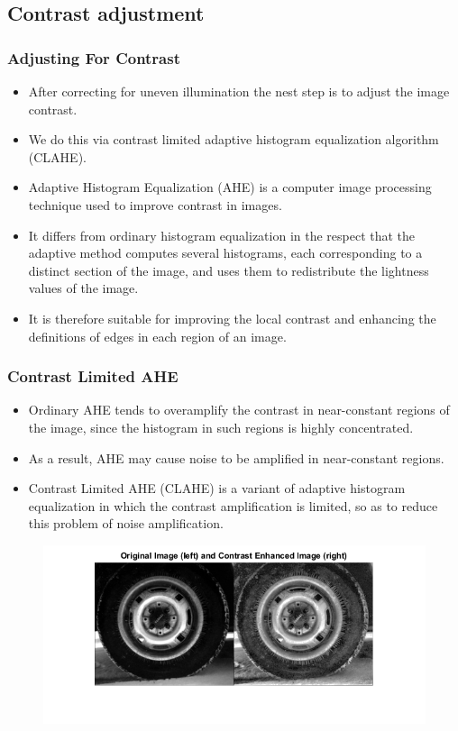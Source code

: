 \documentclass{beamer}
\begin{document}
\subsection{Contrast adjustment}
\begin{frame}
\frametitle{Adjusting For Contrast}
\begin{itemize}
   \item After correcting for uneven illumination the nest step is to adjust the image contrast.
   \item  We do this via contrast limited adaptive histogram equalization algorithm (CLAHE). 
   \item Adaptive  Histogram Equalization (AHE) is a computer image processing technique used to improve contrast in images. 
   \item It differs from ordinary histogram equalization in the respect that the adaptive method computes several histograms, each corresponding to a distinct section of the image, and uses them to redistribute the lightness values of the image. 
   \item It is therefore suitable for improving the local contrast and enhancing the definitions of edges in each region of an image.
\end{itemize}
\end{frame}


\begin{frame}
\frametitle{Contrast Limited AHE}
\begin{itemize}
   \item Ordinary AHE tends to overamplify the contrast in near-constant regions of the image, since the histogram in such regions is highly concentrated.
   \item  As a result, AHE may cause noise to be amplified in near-constant regions. 
   \item  Contrast Limited AHE (CLAHE) is a variant of adaptive histogram equalization in which the contrast amplification is limited, so as to reduce this problem of noise amplification.
\end{itemize}
\begin{figure}
    \centering
    \includegraphics[scale=0.4]{clahe.png}
\end{figure}
\end{frame}
\end{document}
